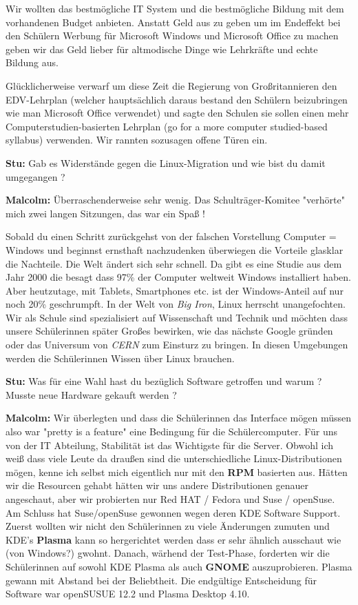 \documentclass[10pt,a4paper,ngerman,twoside]{article} %
\begin{document}
\begin{multicols}{3}
Wir wollten das bestmögliche IT System und die bestmögliche Bildung mit dem vorhandenen Budget anbieten. Anstatt Geld aus zu geben um im Endeffekt bei den Schülern Werbung für Microsoft Windows und Microsoft Office zu machen geben wir das Geld lieber für altmodische Dinge wie Lehrkräfte und echte Bildung aus.

Glücklicherweise verwarf um diese Zeit die Regierung von Großritannieren den EDV-Lehrplan (welcher hauptsächlich daraus bestand den Schülern beizubringen wie man Microsoft Office verwendet) und sagte den Schulen sie sollen einen mehr Computerstudien-basierten Lehrplan (go for a more computer studied-based syllabus) verwenden. Wir rannten sozusagen offene Türen ein.

\textbf{Stu:} Gab es Widerstände gegen die Linux-Migration und wie bist du damit umgegangen ?

\textbf{Malcolm:} Überraschenderweise sehr wenig. Das Schulträger-Komitee "verhörte" mich zwei langen Sitzungen, das war ein Spaß ! 

Sobald du einen Schritt zurückgehst von der falschen Vorstellung Computer = Windows und beginnst ernsthaft nachzudenken überwiegen die Vorteile glasklar die Nachteile. Die Welt ändert sich sehr schnell. Da gibt es eine Studie aus dem Jahr 2000 die besagt dass 97\% der Computer weltweit Windows installiert haben. Aber heutzutage, mit Tablets, Smartphones etc. ist der Windows-Anteil auf nur noch 20\% geschrumpft. In der Welt von \textit{Big Iron}, Linux herrscht unangefochten. Wir als Schule  sind spezialisiert auf Wissenschaft und Technik und möchten dass unsere Schülerinnen später Großes bewirken, wie das nächste Google gründen oder das Universum von \textit{CERN} zum Einsturz zu bringen. In diesen Umgebungen werden die Schülerinnen Wissen über Linux brauchen.

\textbf{Stu:} Was für eine Wahl hast du bezüglich Software getroffen und warum ? Musste neue Hardware gekauft werden ?

\textbf{Malcolm:} Wir überlegten und dass die Schülerinnen das Interface mögen müssen also war "pretty is a feature" eine Bedingung für die Schülercomputer. Für uns von der IT Abteilung, Stabilität ist das Wichtigste für die Server. Obwohl ich weiß dass viele Leute da draußen sind die unterschiedliche Linux-Distributionen mögen, kenne ich selbst mich eigentlich nur mit den \textbf{RPM} basierten aus. Hätten wir die Resourcen gehabt hätten wir uns andere Distributionen genauer angeschaut, aber wir probierten nur Red HAT / Fedora und Suse / openSuse. Am Schluss hat Suse/openSuse gewonnen wegen deren KDE Software Support. Zuerst wollten wir nicht den Schülerinnen zu viele Änderungen zumuten und KDE's \textbf{Plasma} kann so hergerichtet werden dass er sehr ähnlich ausschaut wie (von Windows?) gwohnt. Danach, wärhend der Test-Phase, forderten wir die Schülerinnen auf sowohl KDE Plasma als auch \textbf{GNOME} auszuprobieren. Plasma gewann mit Abstand bei der Beliebtheit. Die endgültige Entscheidung für Software war openSUSUE 12.2 und Plasma Desktop 4.10.


\end{multicols}
\end{document}
